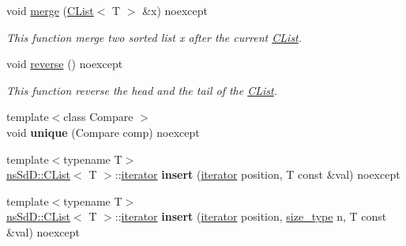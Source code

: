 \begin{DoxyCompactItemize}
void \hyperlink{classnsSdD_1_1CList_a6f41b4a08e34f5081aaa69a4b00474ec}{merge} (\hyperlink{classnsSdD_1_1CList}{C\+List}$<$ T $>$ \&x) noexcept
\begin{DoxyCompactList}\small\item\em This function merge two sorted list {\ttfamily x} after the current \hyperlink{classnsSdD_1_1CList}{C\+List}. \end{DoxyCompactList}\item 
\hypertarget{classnsSdD_1_1CList_a60dbb7a753634838fb2f705ce84764f9}{void \hyperlink{classnsSdD_1_1CList_a60dbb7a753634838fb2f705ce84764f9}{reverse} () noexcept}\label{classnsSdD_1_1CList_a60dbb7a753634838fb2f705ce84764f9}

\begin{DoxyCompactList}\small\item\em This function reverse the head and the tail of the \hyperlink{classnsSdD_1_1CList}{C\+List}. \end{DoxyCompactList}\item 
\hypertarget{classnsSdD_1_1CList_afa271b480c0498942afb039342557687}{{\footnotesize template$<$class Compare $>$ }\\void {\bfseries unique} (Compare comp) noexcept}\label{classnsSdD_1_1CList_afa271b480c0498942afb039342557687}

\item 
\hypertarget{classnsSdD_1_1CList_a40896846d4660f4f76b7078b84e5c7c8}{{\footnotesize template$<$typename T$>$ }\\\hyperlink{classnsSdD_1_1CList}{ns\+Sd\+D\+::\+C\+List}$<$ T $>$\+::\hyperlink{classnsSdD_1_1CList_afdaca29586106fc15940d8529f4990f8}{iterator} {\bfseries insert} (\hyperlink{classnsSdD_1_1CList_afdaca29586106fc15940d8529f4990f8}{iterator} position, T const \&val) noexcept}\label{classnsSdD_1_1CList_a40896846d4660f4f76b7078b84e5c7c8}

\item 
\hypertarget{classnsSdD_1_1CList_a4ba5eeb4a306375f6c68a441e1e0da9e}{{\footnotesize template$<$typename T$>$ }\\\hyperlink{classnsSdD_1_1CList}{ns\+Sd\+D\+::\+C\+List}$<$ T $>$\+::\hyperlink{classnsSdD_1_1CList_afdaca29586106fc15940d8529f4990f8}{iterator} {\bfseries insert} (\hyperlink{classnsSdD_1_1CList_afdaca29586106fc15940d8529f4990f8}{iterator} position, \hyperlink{classnsSdD_1_1CList_a91d4b6b8c89816da277ee27d32df5478}{size\+\_\+type} n, T const \&val) noexcept}\label{classnsSdD_1_1CList_a4ba5eeb4a306375f6c68a441e1e0da9e}


\end{DoxyCompactItemize}
